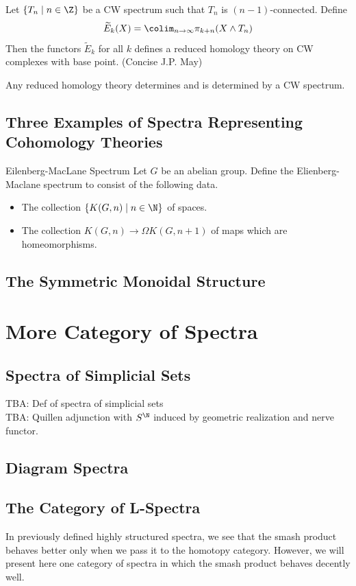 \documentclass[a4paper]{article}
\begin{document}
\begin{thm}{}{} Let $\{T_n\;|\;n\in\Z\}$ be a CW spectrum such that $T_n$ is $(n-1)$-connected. Define $$\widetilde{E}_k(X)=\colim_{n\to\infty}\pi_{k+n}(X\wedge T_n)$$ Then the functors $\widetilde{E}_k$ for all $k$ defines a reduced homology theory on CW complexes with base point. (Concise J.P. May)
\end{thm}

\begin{thm}{}{} Any reduced homology theory determines and is determined by a CW spectrum. 
\end{thm}

\subsection{Three Examples of Spectra Representing Cohomology Theories}
\begin{defn}{Eilenberg-MacLane Spectrum}{} Let $G$ be an abelian group. Define the Elienberg-Maclane spectrum to consist of the following data. 
\begin{itemize}
\item The collection $\{K(G,n)\;|\;n\in\N\}$ of spaces. 
\item The collection $K(G,n)\to\Omega K(G,n+1)$ of maps which are homeomorphisms. 
\end{itemize}
\end{defn}

\subsection{The Symmetric Monoidal Structure}

\pagebreak
\section{More Category of Spectra}
\subsection{Spectra of Simplicial Sets}
TBA: Def of spectra of simplicial sets\\
TBA: Quillen adjunction with $S^\N$ induced by geometric realization and nerve functor. 

\subsection{Diagram Spectra}

\subsection{The Category of L-Spectra}
In previously defined highly structured spectra, we see that the smash product behaves better only when we pass it to the homotopy category. However, we will present here one category of spectra in which the smash product behaves decently well. 
\end{document}
